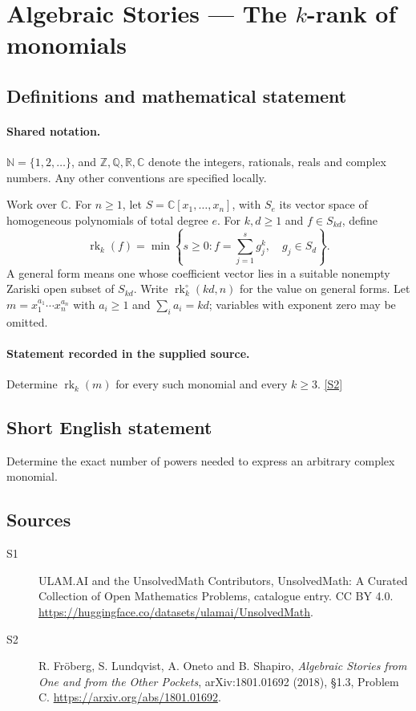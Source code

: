 \documentclass[11pt]{article}
\newcommand{\sref}[2]{\hyperlink{source:#1:#2}{[S#2]}}
\begin{document}
\section{Algebraic Stories — The $k$-rank of monomials}\label{statement}

\subsection{Definitions and mathematical statement}

\paragraph{Shared notation.}$\mathbb N=\{1,2,\ldots\}$, and $\mathbb Z,\mathbb Q,\mathbb R,\mathbb C$ denote the integers, rationals, reals and complex numbers. Any other conventions are specified locally.


Work over $\mathbb C$. For $n\geq1$, let $S=\mathbb C[x_1,\ldots,x_n]$, with $S_e$ its vector space of homogeneous polynomials of total degree $e$. For $k,d\geq1$ and $f\in S_{kd}$, define
\[\operatorname{rk}_k(f)=\min\left\{s\geq0:f=\sum_{j=1}^{s}g_j^k,\quad g_j\in S_d\right\}.
\]
A general form means one whose coefficient vector lies in a suitable nonempty Zariski open subset of $S_{kd}$. Write $\operatorname{rk}_k^\circ(kd,n)$ for the value on general forms. Let $m=x_1^{a_1}\cdots x_n^{a_n}$ with $a_i\geq1$ and $\sum_i a_i=kd$; variables with exponent zero may be omitted.
\paragraph{Statement recorded in the supplied source.}
Determine $\operatorname{rk}_k(m)$ for every such monomial and every $k\geq3$. \sref{statement}{2}
\subsection{Short English statement}
Determine the exact number of powers needed to express an arbitrary complex monomial.
\subsection{Sources}
\begin{description}
\item[\hypertarget{source:statement:1}{S1}] ULAM.AI and the UnsolvedMath Contributors, UnsolvedMath: A Curated Collection of Open Mathematics Problems, catalogue entry. CC BY 4.0. \url{https://huggingface.co/datasets/ulamai/UnsolvedMath}.
\item[\hypertarget{source:statement:2}{S2}] R. Fröberg, S. Lundqvist, A. Oneto and B. Shapiro, \emph{Algebraic Stories from One and from the Other Pockets}, arXiv:1801.01692 (2018), §1.3, Problem C. \url{https://arxiv.org/abs/1801.01692}.
\end{description}
\label{end:statement}
\end{document}
